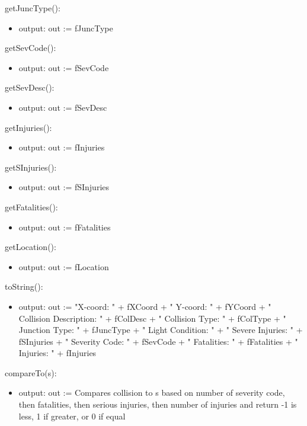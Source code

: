 \documentclass[12pt]{article}
\begin{document}
\noindent getJuncType():
\begin{itemize}
    \item output: out := fJuncType
\end{itemize}

\noindent getSevCode():
\begin{itemize}
    \item output: out := fSevCode
\end{itemize}

\noindent getSevDesc():
\begin{itemize}
    \item output: out := fSevDesc
\end{itemize}

\noindent getInjuries():
\begin{itemize}
    \item output: out := fInjuries
\end{itemize}

\noindent getSInjuries():
\begin{itemize}
    \item output: out := fSInjuries
\end{itemize}

\noindent getFatalities():
\begin{itemize}
    \item output: out := fFatalities
\end{itemize}

\noindent getLocation():
\begin{itemize}
    \item output: out := fLocation
\end{itemize}

\noindent toString():
\begin{itemize}
    \item output: out := "X-coord: " + fXCoord + " Y-coord: " + fYCoord + " Collision Description: " + fColDesc + " Collision Type: " + fColType + " Junction Type: " + fJuncType + " Light Condition: " + " Severe Injuries: " + fSInjuries + " Severity Code: " + fSevCode + " Fatalities: " + fFatalities + " Injuries: " + fInjuries
\end{itemize}

\noindent compareTo(s):
\begin{itemize}
    \item output: out := Compares collision to s based on number of severity code, then fatalities, then serious injuries, then number of injuries and return -1 is less, 1 if greater, or 0 if equal
\end{itemize}
\end{document}
